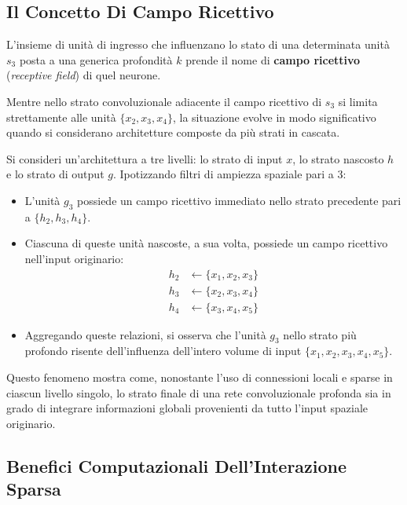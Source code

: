 ﻿\documentclass[11pt, a4paper]{article}
\begin{document}
\subsection{Il Concetto Di Campo Ricettivo}

L'insieme di unità di ingresso che influenzano lo stato di una determinata unità $s_3$ posta a una generica profondità $k$ prende il nome di \textbf{campo ricettivo} (\emph{receptive field}) di quel neurone.


Mentre nello strato convoluzionale adiacente il campo ricettivo di $s_3$ si limita strettamente alle unità $\{x_2, x_3, x_4\}$, la situazione evolve in modo significativo quando si considerano architetture composte da più strati in cascata.


Si consideri un'architettura a tre livelli: lo strato di input $x$, lo strato nascosto $h$ e lo strato di output $g$. Ipotizzando filtri di ampiezza spaziale pari a 3:
\begin{itemize}
    \item L'unità $g_3$ possiede un campo ricettivo immediato nello strato precedente pari a $\{h_2, h_3, h_4\}$.
    \item Ciascuna di queste unità nascoste, a sua volta, possiede un campo ricettivo nell'input originario:
    \begin{align*}
        h_2 &\leftarrow \{x_1, x_2, x_3\} \\
        h_3 &\leftarrow \{x_2, x_3, x_4\} \\
        h_4 &\leftarrow \{x_3, x_4, x_5\}
    \end{align*}
    \item Aggregando queste relazioni, si osserva che l'unità $g_3$ nello strato più profondo risente dell'influenza dell'intero volume di input $\{x_1, x_2, x_3, x_4, x_5\}$.
\end{itemize}

Questo fenomeno mostra come, nonostante l'uso di connessioni locali e sparse in ciascun livello singolo, lo strato finale di una rete convoluzionale profonda sia in grado di integrare informazioni globali provenienti da tutto l'input spaziale originario.

\subsection{Benefici Computazionali Dell'Interazione Sparsa}
\end{document}
